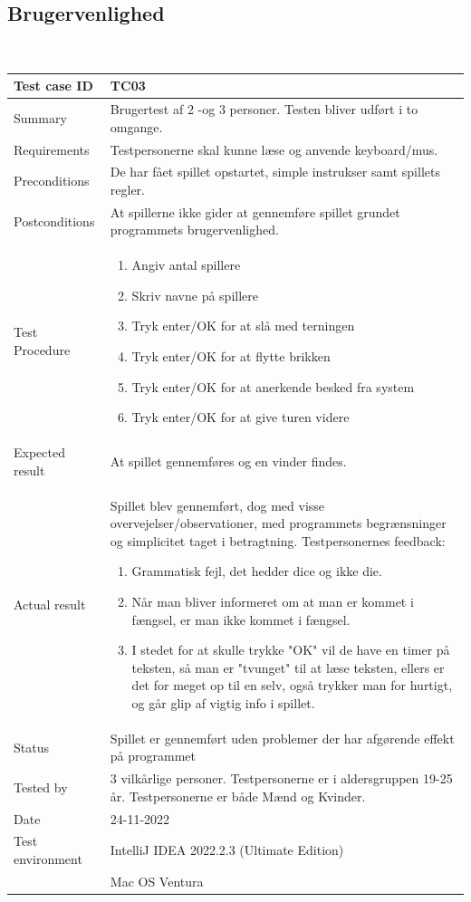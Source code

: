 \documentclass{article}
\begin{document}
\subsection{Brugervenlighed}
\\
\begin{tabular}{ | m{} | m{}|}
    \hline
    Test case ID & TC03  \\
    \hline
    Summary & Brugertest af 2 -og 3 personer. Testen bliver udført i to omgange. \\
    \hline
    Requirements & Testpersonerne skal kunne læse og anvende keyboard/mus.\\
    \hline
    Preconditions & De har fået spillet opstartet, simple instrukser samt spillets regler.\\
    \hline
    Postconditions & At spillerne ikke gider at gennemføre spillet grundet programmets brugervenlighed.\\
    \hline
    Test Procedure & \begin{enumerate}[itemsep=0.1mm]
        \item Angiv antal spillere 
        \item Skriv navne på spillere 
        \item Tryk enter/OK for at slå med terningen
        \item Tryk enter/OK for at flytte brikken
        \item Tryk enter/OK for at anerkende besked fra system
        \item Tryk enter/OK for at give turen videre
    \end{enumerate} \\

    \hline
    Expected result & At spillet gennemføres og en vinder findes. \\
    \hline
    Actual result & Spillet blev gennemført, dog med visse overvejelser/observationer, med programmets begrænsninger og simplicitet taget i betragtning. Testpersonernes feedback: \begin{enumerate}[itemsep=0.1mm]
        \item Grammatisk fejl, det hedder dice og ikke die. 
        \item Når man bliver informeret om at man er kommet i fængsel, er man ikke kommet i fængsel. 
        \item I stedet for at skulle trykke "OK" vil de have en timer på teksten, så man er "tvunget" til at læse teksten, ellers er det for meget op til en selv, også trykker man for hurtigt, og går glip af vigtig info i spillet. 
    \end{enumerate}\\
    \hline
    Status & Spillet er gennemført uden problemer der har afgørende effekt på programmet\\
    \hline
    Tested by & 3 vilkårlige personer. Testpersonerne er i aldersgruppen 19-25 år. Testpersonerne er både Mænd og Kvinder.\\
    \hline
    Date & 24-11-2022\\
    \hline
    Test environment & IntelliJ IDEA 2022.2.3 (Ultimate Edition)\\
    &Mac OS Ventura\\
    \hline
\end{tabular}
\end{document}

